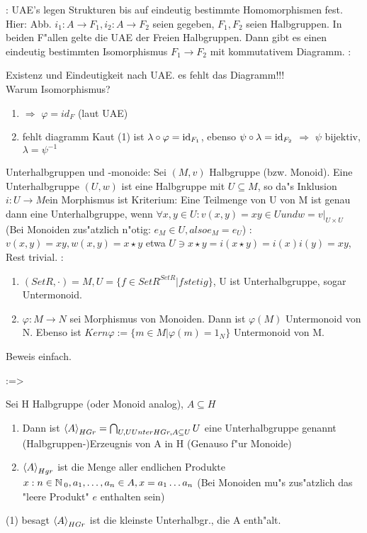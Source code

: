 \remark:{
  UAE's legen Strukturen bis auf eindeutig bestimmte Homomorphismen fest. \\
  Hier: Abb. $i_1:A\to F_1, i_2:A\to F_2$ seien gegeben, $F_1,F_2$ seien Halbgruppen. 
  In beiden F"allen gelte die UAE der Freien Halbgruppen. Dann gibt es einen eindeutig bestimmten Isomorphismus 
  $F_1\to F_2$ mit kommutativem Diagramm.}
\deduction:{
  Existenz und Eindeutigkeit nach UAE. es fehlt das Diagramm!!! \\
  Warum Isomorphismus?
  \begin{enumerate}
    \item 
       $\Rightarrow$ $\varphi=id_F$ (laut UAE)
	\item fehlt diagramm
	  Kaut (1) ist $\lambda \circ \varphi=\operatorname{id}_{F_1}$, ebenso $\psi\circ\lambda=\operatorname{id}_{F_2}$
	  $\Rightarrow$ $\psi$ bijektiv, $\lambda=\psi^{-1}$
  \end{enumerate}}
 Unterhalbgruppen und -monoide:{
  Sei $(M,v)$ Halbgruppe (bzw. Monoid). Eine Unterhalbgruppe $(U,w)$ ist eine Halbgruppe mit $U\subseteq M$, so da"s Inklusion 
  $i:U\to M $ein Morphismus ist} 
\remark Kriterium:{
  Eine Teilmenge von U von M ist genau dann eine Unterhalbgruppe, wenn $\forall x,y\in U: v(x,y)=xy\in U und 
  w=v\Big|_{U\times U}$ (Bei Monoiden zus"atzlich n"otig: $e_M\in U, also e_M=e_U$)}
\deduction:{
  $v(x,y)=xy, w(x,y)=x\star y$ etwa $U\ni x\star y=i(x\star y)=i(x)i(y)=xy$, Rest trivial.}
\example:{
  \begin{enumerate}
    \item $(SetR,\cdot)=M, U=\{ f\in SetR^{SetR}\vert f stetig\}$, U ist Unterhalbgruppe, sogar
	  Untermonoid.
	\item $\varphi:M\to N$ sei Morphismus von Monoiden. Dann ist $\varphi(M)$ Untermonoid von N.
 	  Ebenso ist $Kern\varphi:=\{ m\in M\vert\varphi(m)=1_N\}$ Untermonoid von M.
  \end{enumerate}
  Beweis einfach.}
\lemma:=>{
  Sei H Halbgruppe (oder Monoid analog), $A\subseteq H$
  \begin{enumerate}
    \item Dann ist ${\left\langle A\right\rangle} _{HGr}=\bigcap_{U, U UnterHGr,A\subseteq U}U$ eine Unterhalbgruppe
	  genannt (Halbgruppen-)Erzeugnis von A in H (Genauso f"ur Monoide)
    \item ${\left\langle A\right\rangle}_{Hgr}$ ist die Menge aller endlichen Produkte $x: n\in \mathbb N_{\> 0}, a_1,\ldots,a_n\in A,
	x=a_1\ldots a_n$ (Bei Monoiden mu"s zus"atzlich das "leere Produkt" $e$ enthalten sein)
  \end{enumerate}
  (1) besagt ${\left\langle A\right\rangle}_{HGr}$ ist die kleinste Unterhalbgr., die A enth"alt.}

